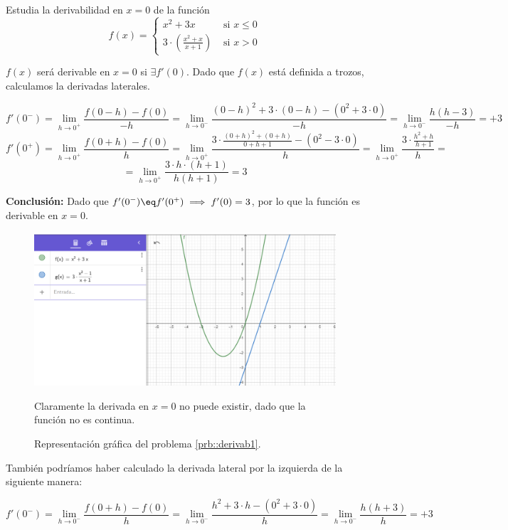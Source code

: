 \begin{problem} Estudia la derivabilidad en $x=0$ de la función 
\label{prb::derivab1}
\[f(x) = \begin{cases} x^2+3x & \text{ si } x\leq 0\\ 3·\left(\frac{x^2+x}{x+1}\right)&\text{ si } x>0\end{cases}\]
\solution

$f(x)$ será derivable en $x=0$ si $\exists f'(0)$. Dado que $f(x)$ está definida a trozos, calculamos la derivadas laterales.

\[f'(0^-) = \lim_{h\to 0^+} \frac{f(0-h)-f(0)}{-h} = \lim_{h\to 0^-} \frac{(0-h)^2+3·(0-h)-(0^2+3·0)}{-h} = \lim_{h\to 0^-} \frac{h(h-3)}{-h} = +3\]
\[f'(0^+) = \lim_{h\to 0^+} \frac{f(0+h)-f(0)}{h} = \lim_{h\to 0^+} \frac{3·\frac{(0+h)^2+(0+h)}{0+h+1} - (0^2-3·0)}{h} = \lim_{h\to 0^+} \frac{3·\frac{h^2+h}{h+1}}{h} = \]
\[=\lim_{h\to 0^+} \frac{3·h·(h+1)}{h(h+1)} = 3 \]

\textbf{Conclusión:} Dado que  $f'(0^-) \eq f'(0^+) \implies f'(0) = 3$, por lo que la función es derivable en $x=0$.

\begin{figure}[h!]
\centering
\includegraphics[scale=0.5]{img/DerivabilidadEjer1}
\label{fig::DerivabEjer1}
\caption{Representación gráfica del problema \ref{prb::derivab1}.}
Claramente la derivada en $x=0$ no puede existir, dado que la función no es continua.
\end{figure}

\obs También podríamos haber calculado la derivada lateral por la izquierda de la siguiente manera:

\[f'(0^-) = \lim_{h\to 0^-} \frac{f(0+h)-f(0)}{h} = \lim_{h\to 0^-} \frac{h^2+3·h-(0^2+3·0)}{h} = \lim_{h\to 0^-} \frac{h(h+3)}{h} = +3\]

\end{problem}

